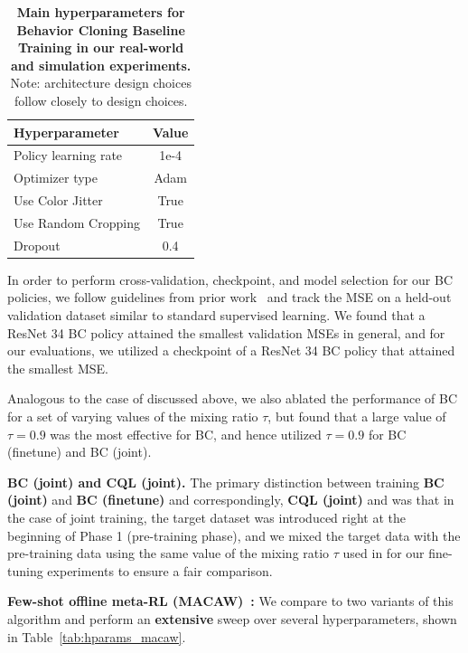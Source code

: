 \documentclass[conference]{IEEEtran}
\begin{document}
\begin{table}[h]
\centering
\begin{tabular}{l|c}
\toprule
\textbf{Hyperparameter} & \textbf{Value}\\  \midrule
Policy learning rate & 1e-4 \\
Optimizer type & Adam \\
Use Color Jitter & True \\
Use Random Cropping & True \\
Dropout & 0.4 \\
\bottomrule
\end{tabular}
\vspace{0.07cm}
\caption{\footnotesize{\textbf{Main hyperparameters for Behavior Cloning Baseline Training in our real-world and simulation experiments.} Note: architecture design choices follow closely to \methodname design choices.}}
\label{tab:hparams_cql}
\vspace{-0.4cm}
\end{table}

In order to perform cross-validation, checkpoint, and model selection for our BC policies, we follow guidelines from prior work~\citep{ebert2021bridge,emmons2021rvs} and track the MSE on a held-out validation dataset similar to standard supervised learning. We found that a ResNet 34 BC policy attained the smallest validation MSEs in general, and for our evaluations, we utilized a checkpoint of a ResNet 34 BC policy that attained the smallest MSE.   

Analogous to the case of \methodname discussed above, we also ablated the performance of BC for a set of varying values of the mixing ratio $\tau$, but found that a large value of $\tau = 0.9$ was the most effective for BC, and hence utilized $\tau = 0.9$ for BC (finetune) and BC (joint).

\textbf{BC (joint) and CQL (joint).} The primary distinction between training \textbf{BC (joint)} and \textbf{BC (finetune)} and correspondingly, \textbf{CQL (joint)} and \methodname was that in the case of joint training, the target dataset was introduced right at the beginning of Phase 1 (pre-training phase), and we mixed the target data with the pre-training data using the same value of the mixing ratio $\tau$ used in for our fine-tuning experiments to ensure a fair comparison.

{
\textbf{Few-shot offline meta-RL (MACAW)~\citep{2020arXiv200806043M}:} We compare to two variants of this algorithm and perform an \textbf{extensive} sweep over several hyperparameters, shown in Table~\ref{tab:hparams_macaw}. 
}
\end{document}
